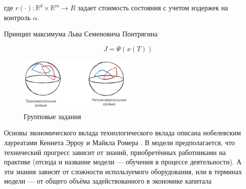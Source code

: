 где $r(\cdot): \mathbb{R}^d \times\mathbb{R}^m \rightarrow R$ задает стоимость состояния с учетом издержек 
на контроль $\alpha$.

Принцип максимума Льва Семеновича Понтрягина

$$
    J = \Psi(x(T))
$$


\begin{figure}[h]
    \centering
    \includegraphics[width=0.5\textwidth]{assets/economics/tranversality.excalidraw.png}
    \caption{Групповые задания}
    \label{group_task}
\end{figure}



Основы экономического вклада технологического вклада описана нобелевским лауреатами Кеннета Эрроу и Майкла Ромера \cite{arrow1962economic} \cite{romer1986increasing}. 
В модели предполагается, что технический прогресс зависит от знаний, приобретённых работниками на практике (отсюда и название модели — обучения в процессе деятельности).
А эти знания зависят от сложности используемого оборудования, или в терминах модели — от общего объёма задействованного в экономике капитала
